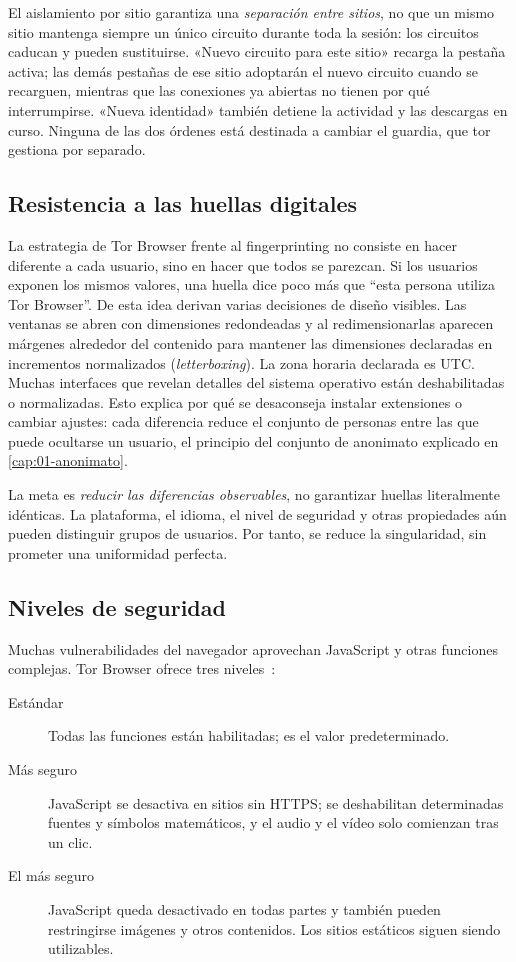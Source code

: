 El aislamiento por sitio garantiza una \emph{separación entre sitios}, no que un mismo sitio mantenga siempre un único circuito durante toda la sesión: los circuitos caducan y pueden sustituirse. «Nuevo circuito para este sitio» recarga la pestaña activa; las demás pestañas de ese sitio adoptarán el nuevo circuito cuando se recarguen, mientras que las conexiones ya abiertas no tienen por qué interrumpirse. «Nueva identidad» también detiene la actividad y las descargas en curso. Ninguna de las dos órdenes está destinada a cambiar el guardia, que tor gestiona por separado.

\subsection{Resistencia a las huellas digitales}

La estrategia de Tor Browser frente al fingerprinting no consiste en hacer diferente a cada usuario, sino en hacer que todos se parezcan. Si los usuarios exponen los mismos valores, una huella dice poco más que \enquote{esta persona utiliza Tor Browser}. De esta idea derivan varias decisiones de diseño visibles. Las ventanas se abren con dimensiones redondeadas y al redimensionarlas aparecen márgenes alrededor del contenido para mantener las dimensiones declaradas en incrementos normalizados (\emph{letterboxing}). La zona horaria declarada es UTC. Muchas interfaces que revelan detalles del sistema operativo están deshabilitadas o normalizadas. Esto explica por qué se desaconseja instalar extensiones o cambiar ajustes: cada diferencia reduce el conjunto de personas entre las que puede ocultarse un usuario, el principio del conjunto de anonimato explicado en \cref{cap:01-anonimato}.

La meta es \emph{reducir las diferencias observables}, no garantizar huellas literalmente idénticas. La plataforma, el idioma, el nivel de seguridad y otras propiedades aún pueden distinguir grupos de usuarios. Por tanto, se reduce la singularidad, sin prometer una uniformidad perfecta.

\subsection{Niveles de seguridad}

Muchas vulnerabilidades del navegador aprovechan JavaScript y otras funciones complejas. Tor Browser ofrece tres niveles~\cite{tbmanual}:
\begin{description}
  \item[Estándar] Todas las funciones están habilitadas; es el valor predeterminado.
  \item[Más seguro] JavaScript se desactiva en sitios sin HTTPS; se deshabilitan determinadas fuentes y símbolos matemáticos, y el audio y el vídeo solo comienzan tras un clic.
  \item[El más seguro] JavaScript queda desactivado en todas partes y también pueden restringirse imágenes y otros contenidos. Los sitios estáticos siguen siendo utilizables.
\end{description}

